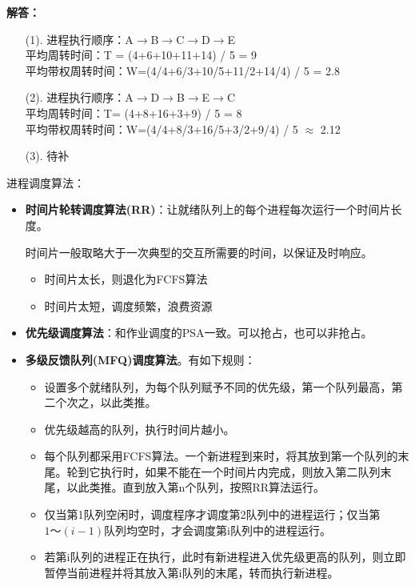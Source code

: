 \documentclass[12pt, a4paper, oneside]{ctexart}
\newenvironment{solution}{\begin{shaded}\par\noindent\textbf{解答：}}{\end{shaded}\par}
\begin{document}
\begin{solution}
  \begin{enumerate}
    \item [(1). ]
    进程执行顺序：A$\rightarrow$B$\rightarrow$C$\rightarrow$D$\rightarrow$E\\
    平均周转时间：T = (4+6+10+11+14) / 5 = 9\\
    平均带权周转时间：W=(4/4+6/3+10/5+11/2+14/4) / 5 = 2.8
    \item [(2). ]
    进程执行顺序：A$\rightarrow$D$\rightarrow$B$\rightarrow$E$\rightarrow$C\\
    平均周转时间：T= (4+8+16+3+9) / 5 = 8 \\
    平均带权周转时间：W=(4/4+8/3+16/5+3/2+9/4) / 5 $\approx$ 2.12
    \item [(3). ]
    待补
  \end{enumerate}
\end{solution}

进程调度算法：
\begin{itemize}
  \item {\bf 时间片轮转调度算法(RR)}：让就绪队列上的每个进程每次运行一个时间片长度。

  时间片一般取略大于一次典型的交互所需要的时间，以保证及时响应。
  \begin{itemize}
      \item 时间片太长，则退化为FCFS算法
      \item 时间片太短，调度频繁，浪费资源
  \end{itemize}
  \item {\bf 优先级调度算法}：和作业调度的PSA一致。可以抢占，也可以非抢占。
  \item {\bf 多级反馈队列(MFQ)调度算法}。有如下规则：
  \begin{itemize}
    \item 设置多个就绪队列，为每个队列赋予不同的优先级，第一个队列最高，第二个次之，以此类推。
    \item 优先级越高的队列，执行时间片越小。
    \item 每个队列都采用FCFS算法。一个新进程到来时，将其放到第一个队列的末尾。轮到它执行时，如果不能在一个时间片内完成，则放入第二队列末尾，以此类推。直到放入第n个队列，按照RR算法运行。
    \item 仅当第1队列空闲时，调度程序才调度第2队列中的进程运行；仅当第$1\text{～}(i-1)$队列均空时，才会调度第i队列中的进程运行。
    \item 若第i队列的进程正在执行，此时有新进程进入优先级更高的队列，则立即暂停当前进程并将其放入第i队列的末尾，转而执行新进程。
  \end{itemize}
\end{itemize}
\end{document}
